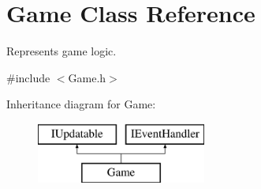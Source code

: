 \hypertarget{class_game}{}\section{Game Class Reference}
\label{class_game}


Represents game logic.  




{\ttfamily \#include $<$Game.\+h$>$}

Inheritance diagram for Game\+:\begin{figure}[H]
\begin{center}
\leavevmode
\includegraphics[height=2.000000cm]{class_game}
\end{center}
\end{figure}
